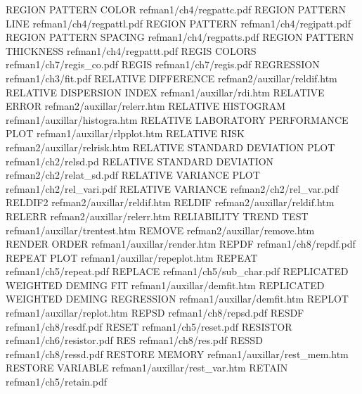 REGION PATTERN COLOR                    refman1/ch4/regpattc.pdf
REGION PATTERN LINE                     refman1/ch4/regpattl.pdf
REGION PATTERN                          refman1/ch4/regipatt.pdf
REGION PATTERN SPACING                  refman1/ch4/regpatts.pdf
REGION PATTERN THICKNESS                refman1/ch4/regpattt.pdf
REGIS COLORS                            refman1/ch7/regis_co.pdf
REGIS                                   refman1/ch7/regis.pdf
REGRESSION                              refman1/ch3/fit.pdf
RELATIVE DIFFERENCE                     refman2/auxillar/reldif.htm
RELATIVE DISPERSION INDEX               refman1/auxillar/rdi.htm
RELATIVE ERROR                          refman2/auxillar/relerr.htm
RELATIVE HISTOGRAM                      refman1/auxillar/histogra.htm
RELATIVE LABORATORY PERFORMANCE PLOT    refman1/auxillar/rlpplot.htm
RELATIVE RISK                           refman2/auxillar/relrisk.htm
RELATIVE STANDARD DEVIATION PLOT        refman1/ch2/relsd.pd
RELATIVE STANDARD DEVIATION             refman2/ch2/relat_sd.pdf
RELATIVE VARIANCE PLOT                  refman1/ch2/rel_vari.pdf
RELATIVE VARIANCE                       refman2/ch2/rel_var.pdf
RELDIF2                                 refman2/auxillar/reldif.htm
RELDIF                                  refman2/auxillar/reldif.htm
RELERR                                  refman2/auxillar/relerr.htm
RELIABILITY TREND TEST                  refman1/auxillar/trentest.htm
REMOVE                                  refman2/auxillar/remove.htm
RENDER ORDER                            refman1/auxillar/render.htm
REPDF                                   refman1/ch8/repdf.pdf
REPEAT PLOT                             refman1/auxillar/repeplot.htm
REPEAT                                  refman1/ch5/repeat.pdf
REPLACE                                 refman1/ch5/sub_char.pdf
REPLICATED WEIGHTED DEMING FIT          refman1/auxillar/demfit.htm
REPLICATED WEIGHTED DEMING REGRESSION   refman1/auxillar/demfit.htm
REPLOT                                  refman1/auxillar/replot.htm
REPSD                                   refman1/ch8/repsd.pdf
RESDF                                   refman1/ch8/resdf.pdf
RESET                                   refman1/ch5/reset.pdf
RESISTOR                                refman1/ch6/resistor.pdf
RES                                     refman1/ch8/res.pdf
RESSD                                   refman1/ch8/ressd.pdf
RESTORE MEMORY                          refman1/auxillar/rest_mem.htm
RESTORE VARIABLE                        refman1/auxillar/rest_var.htm
RETAIN                                  refman1/ch5/retain.pdf
